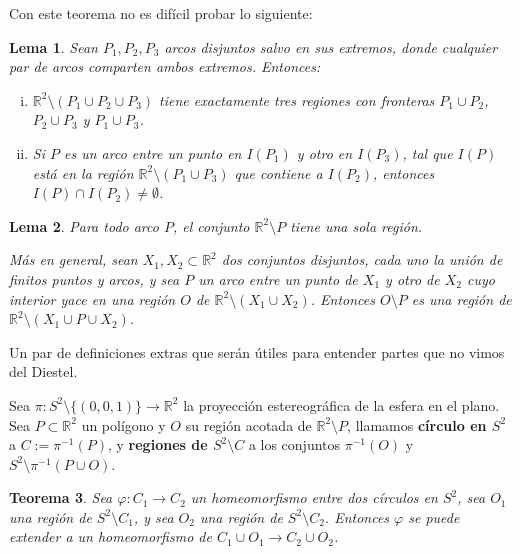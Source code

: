 \documentclass[12pt]{report}
\theoremstyle{plain}
\newtheorem{theorem}{Teorema}[section]
\newtheorem{lemma}[theorem]{Lema}
\theoremstyle{definition}
\newcommand{\reals}{\mathbb{R}}
\begin{document}
Con este teorema no es difícil probar lo siguiente:
\begin{lemma}\label{lema:tres arcos disjuntos forman 3 componentes}
Sean $P_1, P_2, P_3$ arcos disjuntos salvo en sus extremos, donde cualquier par de arcos comparten ambos extremos. Entonces:
\begin{enumerate}[(i)]
\item $\reals ^2 \setminus (P_1 \cup P_2 \cup P_3)$ tiene exactamente tres regiones con fronteras $P_1 \cup P_2$, $P_2 \cup P_3$ y $P_1 \cup P_3$.
\item Si $P$ es un arco entre un punto en $I (P_1)$ y otro en $I(P_3)$, tal que $I(P)$ está en la región $\reals^2 \setminus (P_1 \cup P_3)$ que contiene a $I(P_2)$, entonces $I(P) \cap I(P_2) \neq \emptyset$.
\end{enumerate}
\end{lemma}


\begin{lemma}\label{lema:arco tiene una sola cara}
Para todo arco $P$, el conjunto $\reals^2 \setminus P$ tiene una sola región.

Más en general, sean $X_1,X_2 \subset \reals^2$ dos conjuntos disjuntos, cada uno la unión de finitos puntos y arcos, y sea $P$ un arco entre un punto de $X_1$ y otro de $X_2$ cuyo interior yace en una región $O$ de $\reals^2 \setminus (X_1 \cup X_2)$. Entonces $O\setminus P$ es una región de $\reals^2 \setminus (X_1 \cup P \cup X_2)$.
\end{lemma}



\bigskip

Un par de definiciones extras que serán útiles para entender partes que no vimos del Diestel.

Sea $\pi : S^2 \setminus \{(0,0,1)\} \rightarrow \reals^2$ la proyección estereográfica de la esfera en el plano. Sea $P \subset \reals^2$ un polígono y $O$ su región acotada de $\reals^2 \setminus P$, llamamos \textbf{círculo en $S^2$} a $C := \pi^{-1}(P)$, y \textbf{regiones de $S^2 \setminus C$} a los conjuntos $\pi^{-1} (O)$ y $S^2 \setminus \pi^{-1} ( P \cup O)$.

\begin{theorem}\label{theorem:un homeomorfismo entre dos circulos de S2 se puede extender a un homoemorfismo entre regiones}
Sea $\varphi : C_1 \rightarrow C_2$ un homeomorfismo entre dos círculos en $S^2$, sea $O_1$ una región de $S^2 \setminus C_1$, y sea $O_2$ una región de $S^2 \setminus C_2$. Entonces $\varphi$ se puede extender a un homeomorfismo de $C_1 \cup O_1 \rightarrow C_2 \cup O_2$.
\end{theorem}
\end{document}
